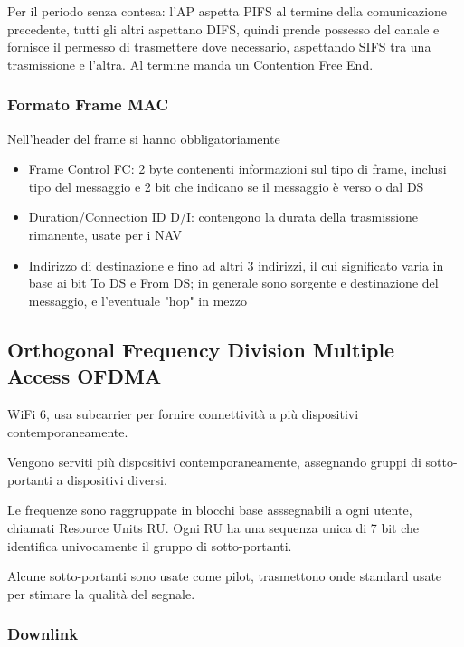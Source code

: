 Per il periodo senza contesa: l'AP aspetta PIFS al termine della comunicazione precedente, tutti gli altri aspettano DIFS, quindi prende possesso del canale e fornisce il permesso di trasmettere dove necessario, aspettando SIFS tra una trasmissione e l'altra. Al termine manda un Contention Free End.

\subsubsection{Formato Frame MAC}

Nell'header del frame si hanno obbligatoriamente 
\begin{itemize}
    \item Frame Control FC: 2 byte contenenti informazioni sul tipo di frame, inclusi tipo del messaggio e 2 bit che indicano se il messaggio è verso o dal DS
    
    \item Duration/Connection ID D/I: contengono la durata della trasmissione rimanente, usate per i NAV
    
    \item Indirizzo di destinazione e fino ad altri 3 indirizzi, il cui significato varia in base ai bit To DS e From DS; in generale sono sorgente e destinazione del messaggio, e l'eventuale "hop" in mezzo
\end{itemize}

\subsection{Orthogonal Frequency Division Multiple Access OFDMA}

WiFi 6, usa subcarrier per fornire connettività a più dispositivi contemporaneamente. 

Vengono serviti più dispositivi contemporaneamente, assegnando gruppi di sotto-portanti a dispositivi diversi.

Le frequenze sono raggruppate in blocchi base asssegnabili a ogni utente, chiamati Resource Units RU. Ogni RU ha una sequenza unica di 7 bit che identifica univocamente il gruppo di sotto-portanti.

Alcune sotto-portanti sono usate come pilot, trasmettono onde standard usate per stimare la qualità del segnale.

\subsubsection{Downlink}

